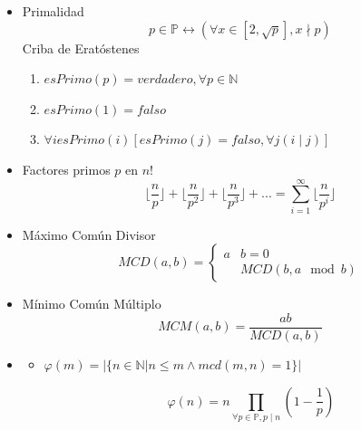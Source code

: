 \documentclass[a4paper,spanish,10pt]{article}
\begin{document}
	\begin{itemize}
		\item{
			Primalidad\\
			\begin{equation}
				p \in \mathbb{P} \leftrightarrow (\forall  x\in [2,\sqrt{p}] , x \nmid p)
			\end{equation}
			Criba de Erat\'ostenes\\
			\begin{enumerate}
				\item$esPrimo(p) = verdadero, \forall p \in \mathbb{N} $
				\item$esPrimo(1) = falso $
				\item$\forall i esPrimo(i)[ esPrimo(j)=falso, \forall j (i\mid j) ]$
			\end{enumerate}
		}
		\item{
			Factores primos $p$ en $n!$\\
			\begin{equation}
				\Bigg\lfloor\frac{n}{p}\Bigg\rfloor+\Bigg\lfloor\frac{n}{p^2}\Bigg\rfloor+\Bigg\lfloor\frac{n}{p^3}\Bigg\rfloor+...=\sum_{i=1}^\infty {\Bigg\lfloor \frac{n}{p^i} \Bigg\rfloor} 
			\end{equation}
		}
		\item{
			M\'aximo Com\'un Divisor
			\begin{equation}
				MCD(a,b)=
				\begin{cases}
					a&b=0\\
					&MCD(b,a \mod b)
				\end{cases}
			\end{equation}
		}
		\item{
			M\'inimo Com\'un M\'ultiplo
			\begin{equation}
				MCM(a,b)=\frac{ab}{MCD(a,b)}
			\end{equation}
		}
		\item {
			\begin{itemize}
				\item {$\varphi(m) = |\{n \in \mathbb{N} | n \leq m \land mcd(m, n) = 1 \}| $
				
					\begin{equation}
						\varphi(n)=n\prod_{ \forall p \in \mathbb{P} , p \mid n}{\left(1-\frac{1}{p}\right)}
					\end{equation}
					
}
\end{itemize}}
\end{itemize}
\end{document}

